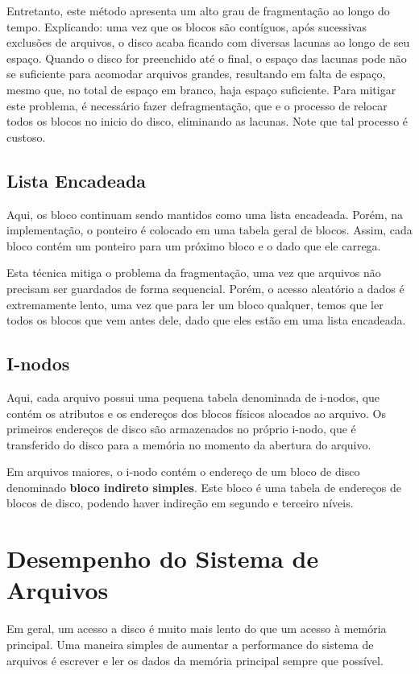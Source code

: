 Entretanto, este método apresenta um alto grau de fragmentação ao longo do tempo. Explicando: uma vez que os blocos são contíguos, após sucessivas exclusões de arquivos, o disco acaba ficando com diversas lacunas ao longo de seu espaço. Quando o disco for preenchido até o final, o espaço das lacunas pode não se suficiente para acomodar arquivos grandes, resultando em falta de espaço, mesmo que, no total de espaço em branco, haja espaço suficiente. Para mitigar este problema, é necessário fazer defragmentação, que e o processo de relocar todos os blocos no inicio do disco, eliminando as lacunas. Note que tal processo é custoso.



\subsection{Lista Encadeada}
Aqui, os bloco continuam sendo mantidos como uma lista encadeada. Porém, na implementação, o ponteiro é colocado em uma tabela geral de blocos. Assim, cada bloco contém um ponteiro para um próximo bloco e o dado que ele carrega.

Esta técnica mitiga o problema da fragmentação, uma vez que arquivos não precisam ser guardados de forma sequencial. Porém, o acesso aleatório a dados é extremamente lento, uma vez que para ler um bloco qualquer, temos que ler todos os blocos que vem antes dele, dado que eles estão em uma lista encadeada.



\subsection{I-nodos}
Aqui, cada arquivo possui uma pequena tabela denominada de i-nodos, que contém os atributos e os endereços dos blocos físicos alocados ao arquivo. Os primeiros endereços de disco são armazenados no próprio i-nodo, que é transferido do disco para a memória no momento da abertura do arquivo.

Em arquivos maiores, o i-nodo contém o endereço de um bloco de disco denominado \textbf{bloco indireto simples}. Este bloco é uma tabela de endereços de blocos de disco, podendo haver indireção em segundo e terceiro níveis.

\section{Desempenho do Sistema de Arquivos}
Em geral, um acesso a disco é muito mais lento do que um acesso à memória principal. Uma maneira simples de aumentar a performance do sistema de arquivos é escrever e ler os dados da memória principal sempre que possível.

